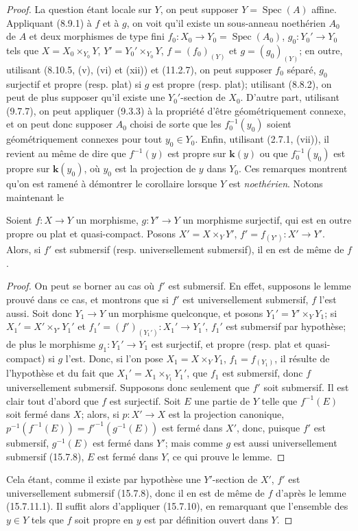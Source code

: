 \begin{proof}
La question étant locale sur $Y$, on peut supposer $Y=\operatorname{Spec}(A)$ affine. Appliquant (8.9.1) à $f$ et à $g$, on voit qu'il existe un sous-anneau noethérien $A_0$ de $A$ et deux morphismes de type fini $f_0:X_0\to Y_0=\operatorname{Spec}(A_0)$, $g_0:Y_0'\to Y_0$ tels que $X=X_0\times_{Y_0}Y$, $Y'=Y_0'\times_{Y_0}Y$, $f=(f_0)_{(Y)}$ et $g=(g_0)_{(Y)}$; en outre, utilisant (8.10.5, (v), (vi) et (xii)) et (11.2.7), on peut supposer $f_0$ séparé, $g_0$ surjectif et propre (resp. plat) si $g$ est propre (resp. plat); utilisant (8.8.2), on peut de plus supposer qu'il existe une $Y_0'$-section de $X_0$. D'autre part, utilisant (9.7.7), on peut appliquer (9.3.3) à la propriété d'être géométriquement connexe, et on peut donc supposer $A_0$ choisi de sorte que les $f_0^{-1}(y_0)$ soient géométriquement connexes pour tout $y_0\in Y_0$. Enfin, utilisant (2.7.1, (vii)), il revient au même de dire que $f^{-1}(y)$ est propre sur $\mathbf k(y)$ ou que $f_0^{-1}(y_0)$ est propre sur $\mathbf k(y_0)$, où $y_0$ est la projection de $y$ dans $Y_0$. Ces remarques montrent qu'on est ramené à démontrer le corollaire lorsque $Y$ est \emph{noethérien}. Notons maintenant le

\begin{lemma}[15.7.11.1]
\label{IV.15.7.11.1-fr}
Soient $f:X\to Y$ un morphisme, $g:Y'\to Y$ un morphisme surjectif, qui est en outre propre ou plat et quasi-compact. Posons $X'=X\times_Y Y'$, $f'=f_{(Y')}:X'\to Y'$. Alors, si $f'$ est submersif (resp. universellement submersif), il en est de même de $f$.
\end{lemma}

\begin{proof}
On peut se borner au cas où $f'$ est submersif. En effet, supposons le lemme prouvé dans ce cas, et montrons que si $f'$ est universellement submersif, $f$ l'est aussi. Soit donc $Y_1\to Y$ un morphisme quelconque, et posons $Y_1'=Y'\times_Y Y_1$; si $X_1'=X'\times_{Y'}Y_1'$ et $f_1'=(f')_{(Y_1')}:X_1'\to Y_1'$, $f_1'$ est submersif par hypothèse; de plus le morphisme $g_1:Y_1'\to Y_1$ est surjectif, et propre (resp. plat et quasi-compact) si $g$ l'est. Donc, si l'on pose $X_1=X\times_Y Y_1$, $f_1=f_{(Y_1)}$, il résulte de l'hypothèse et du fait que $X_1'=X_1\times_{Y_1}Y_1'$, que $f_1$ est submersif, donc $f$ universellement submersif. Supposons donc seulement que $f'$ soit submersif. Il est clair tout d'abord que $f$ est surjectif. Soit $E$ une partie de $Y$ telle que $f^{-1}(E)$ soit fermé dans $X$; alors, si $p:X'\to X$ est la projection canonique,
$p^{-1}(f^{-1}(E))=f'^{-1}(g^{-1}(E))$ est fermé dans $X'$, donc, puisque $f'$ est submersif, $g^{-1}(E)$ est fermé dans $Y'$; mais comme $g$ est aussi universellement submersif (15.7.8), $E$ est fermé dans $Y$, ce qui prouve le lemme.
\end{proof}

Cela étant, comme il existe par hypothèse une $Y'$-section de $X'$, $f'$ est universellement submersif (15.7.8), donc il en est de même de $f$ d'après le lemme (15.7.11.1). Il suffit alors d'appliquer (15.7.10), en remarquant que l'ensemble des $y\in Y$ tels que $f$ soit propre en $y$ est par définition ouvert dans $Y$.
\end{proof}

